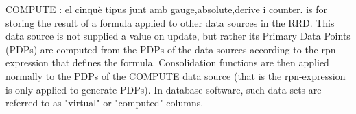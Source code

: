 


















COMPUTE : el cinquè tipus junt amb gauge,absolute,derive i counter. 
is for storing the result of a formula applied to other data sources in the RRD. This data source is not supplied a value on update, but rather its Primary Data Points (PDPs) are computed from the PDPs of the data sources according to the rpn-expression that defines the formula. Consolidation functions are then applied normally to the PDPs of the COMPUTE data source (that is the rpn-expression is only applied to generate PDPs). In database software, such data sets are referred to as "virtual" or "computed" columns.


